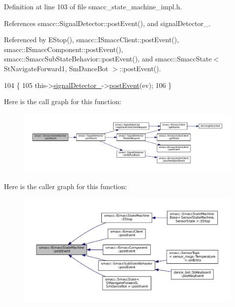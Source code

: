 Definition at line 103 of file smacc\+\_\+state\+\_\+machine\+\_\+impl.\+h.



References smacc\+::\+Signal\+Detector\+::post\+Event(), and signal\+Detector\+\_\+.



Referenced by E\+Stop(), smacc\+::\+I\+Smacc\+Client\+::post\+Event(), smacc\+::\+I\+Smacc\+Component\+::post\+Event(), smacc\+::\+Smacc\+Sub\+State\+Behavior\+::post\+Event(), and smacc\+::\+Smacc\+State$<$ St\+Navigate\+Forward1, Sm\+Dance\+Bot $>$\+::post\+Event().


\begin{DoxyCode}
104 \{
105     this->\hyperlink{classsmacc_1_1ISmaccStateMachine_a3982eb671f5f001cb047d3a467789986}{signalDetector\_}->\hyperlink{classsmacc_1_1SignalDetector_a6ab99d99cef8d101e39797a72daeb2b7}{postEvent}(ev);
106 \}
\end{DoxyCode}


Here is the call graph for this function\+:
\nopagebreak
\begin{figure}[H]
\begin{center}
\leavevmode
\includegraphics[width=350pt]{classsmacc_1_1ISmaccStateMachine_ad80cdd7bbc9a9f3b221c625754fed1ed_cgraph}
\end{center}
\end{figure}




Here is the caller graph for this function\+:
\nopagebreak
\begin{figure}[H]
\begin{center}
\leavevmode
\includegraphics[width=350pt]{classsmacc_1_1ISmaccStateMachine_ad80cdd7bbc9a9f3b221c625754fed1ed_icgraph}
\end{center}
\end{figure}


